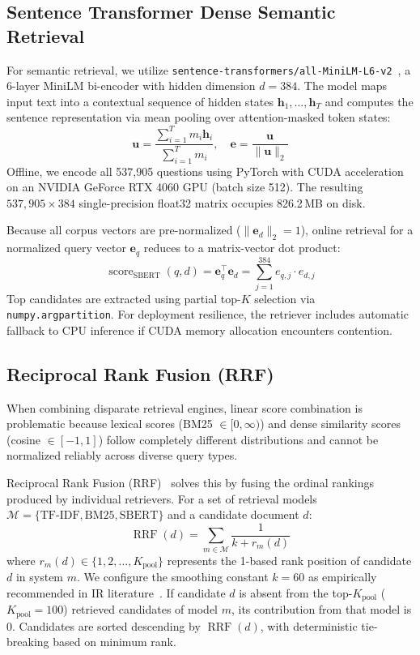 \documentclass[11pt,a4paper]{article}
\begin{document}
\subsection{Sentence Transformer Dense Semantic Retrieval}
For semantic retrieval, we utilize \texttt{sentence-transformers/all-MiniLM-L6-v2}~\cite{reimers2019sentence}, a 6-layer MiniLM bi-encoder with hidden dimension $d = 384$. The model maps input text into a contextual sequence of hidden states $\mathbf{h}_1, \dots, \mathbf{h}_T$ and computes the sentence representation via mean pooling over attention-masked token states:
\begin{equation}
\mathbf{u} = \frac{\sum_{i=1}^T m_i \mathbf{h}_i}{\sum_{i=1}^T m_i}, \quad \mathbf{e} = \frac{\mathbf{u}}{\|\mathbf{u}\|_2}
\end{equation}
Offline, we encode all 537,905 questions using PyTorch with CUDA acceleration on an NVIDIA GeForce RTX 4060 GPU (batch size 512). The resulting $537,905 \times 384$ single-precision float32 matrix occupies 826.2\,MB on disk.

Because all corpus vectors are pre-normalized ($\|\mathbf{e}_d\|_2 = 1$), online retrieval for a normalized query vector $\mathbf{e}_q$ reduces to a matrix-vector dot product:
\begin{equation}
\operatorname{score}_{\text{SBERT}}(q, d) = \mathbf{e}_q^\top \mathbf{e}_d = \sum_{j=1}^{384} e_{q, j} \cdot e_{d, j}
\end{equation}
Top candidates are extracted using partial top-$K$ selection via \texttt{numpy.argpartition}. For deployment resilience, the retriever includes automatic fallback to CPU inference if CUDA memory allocation encounters contention.

\subsection{Reciprocal Rank Fusion (RRF)}
When combining disparate retrieval engines, linear score combination is problematic because lexical scores (BM25 $\in [0, \infty)$) and dense similarity scores (cosine $\in [-1, 1]$) follow completely different distributions and cannot be normalized reliably across diverse query types.

Reciprocal Rank Fusion (RRF)~\cite{cormack2009reciprocal} solves this by fusing the ordinal rankings produced by individual retrievers. For a set of retrieval models $\mathcal{M} = \{\text{TF-IDF}, \text{BM25}, \text{SBERT}\}$ and a candidate document $d$:
\begin{equation}
\label{eq:rrf_formula}
\operatorname{RRF}(d) = \sum_{m \in \mathcal{M}} \frac{1}{k + r_m(d)}
\end{equation}
where $r_m(d) \in \{1, 2, \dots, K_{\text{pool}}\}$ represents the 1-based rank position of candidate $d$ in system $m$. We configure the smoothing constant $k = 60$ as empirically recommended in IR literature~\cite{cormack2009reciprocal}. If candidate $d$ is absent from the top-$K_{\text{pool}}$ ($K_{\text{pool}} = 100$) retrieved candidates of model $m$, its contribution from that model is 0. Candidates are sorted descending by $\operatorname{RRF}(d)$, with deterministic tie-breaking based on minimum rank.
\end{document}
